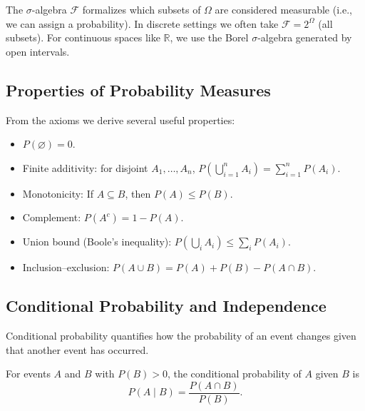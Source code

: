 \documentclass{tufte-handout}
\begin{document}
\begin{marginfigure}
\centering
{}
\caption{A sample space $\Omega$ with two events $A$ and $B$.}
\end{marginfigure}

The $\sigma$-algebra $\mathcal{F}$ formalizes which subsets of $\Omega$ are considered measurable (i.e., we can assign a probability). In discrete settings we often take $\mathcal{F} = 2^{\Omega}$ (all subsets). For continuous spaces like $\mathbb{R}$, we use the Borel $\sigma$-algebra generated by open intervals.

\subsection{Properties of Probability Measures}

From the axioms we derive several useful properties:
\begin{itemize}
    \item $P(\varnothing) = 0$.
    \item Finite additivity: for disjoint $A_1,\dots,A_n$, $P(\bigcup_{i=1}^n A_i) = \sum_{i=1}^n P(A_i)$.
    \item Monotonicity: If $A \subseteq B$, then $P(A) \le P(B)$.
    \item Complement: $P(A^c) = 1 - P(A)$.
    \item Union bound (Boole's inequality): $P(\bigcup_i A_i) \le \sum_i P(A_i)$.
    \item Inclusion–exclusion: $P(A \cup B) = P(A) + P(B) - P(A \cap B)$.
\end{itemize}

\subsection{Conditional Probability and Independence}

Conditional probability quantifies how the probability of an event changes given that another event has occurred.

\begin{defn}
    For events $A$ and $B$ with $P(B) > 0$, the conditional probability of $A$ given $B$ is
    \[
    P(A \mid B) = \frac{P(A \cap B)}{P(B)}.
    \]
\end{defn}
\end{document}
